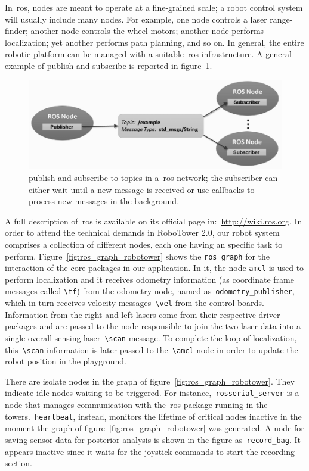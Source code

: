 In~\gls{ros}, nodes are meant to operate at a fine-grained scale; a robot control system will usually include many nodes. For example, one node controls a laser range-finder; another node controls the wheel motors; another node performs localization; yet another performs path planning, and so on. In general, the entire robotic platform can be managed with a suitable~\gls{ros} infrastructure. A general example of publish and subscribe is reported in figure~\ref{fig:ros_pub_sub}.

\begin{figure}[htbp]
	\centering
	\includegraphics[width=13cm]{images/03-foundation/pubsub}
	\caption{publish and subscribe to topics in a~\gls{ros} network; the subscriber can either wait until a new message is received or use callbacks to process new messages in the background.}
	\label{fig:ros_pub_sub}
\end{figure}

A full description of~\gls{ros} is available on its official page in:~\url{http://wiki.ros.org}. In order to attend the technical demands in RoboTower 2.0, our robot system comprises a collection of different nodes, each one having an specific task to perform. Figure~\ref{fig:ros_graph_robotower} shows the \verb|ros_graph| for the interaction of the core packages in our application. In it, the node \verb|amcl| is used to perform localization and it receives odometry information (as coordinate frame messages called \verb|\tf|) from the odometry node, named as~\verb|odometry_publisher|, which in turn receives velocity messages~\verb|\vel| from the control boards. Information from the right and left lasers come from their respective driver packages and are passed to the node responsible to join the two laser data into a single overall sensing laser~\verb|\scan| message. To complete the loop of localization, this~\verb|\scan| information is later passed to the~\verb|\amcl| node in order to update the robot position in the playground.

There are isolate nodes in the graph of figure~\ref{fig:ros_graph_robotower}. They indicate idle nodes waiting to be triggered. For instance,~\verb|rosserial_server| is a node that manages communication with the~\gls{ros} package running in the towers.~\verb|heartbeat|, instead, monitors the lifetime of critical nodes inactive in the moment the graph of figure~\ref{fig:ros_graph_robotower} was generated. A node for saving sensor data for posterior analysis is shown in the figure as~\verb|record_bag|. It appears inactive since it waits for the joystick commands to start the recording section. 

